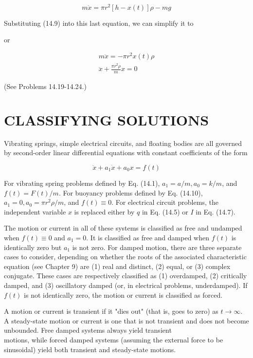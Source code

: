 \documentclass[10pt]{article}
\begin{document}
$$
m \ddot{x}=\pi r^{2}[h-x(t)] \rho-m g
$$

Substituting (14.9) into this last equation, we can simplify it to

or


\begin{gather*}
m \ddot{x}=-\pi r^{2} x(t) \rho \\
\ddot{x}+\frac{\pi r^{2} \rho}{m} x=0 \tag{14.10}
\end{gather*}


(See Problems 14.19-14.24.)

\section*{CLASSIFYING SOLUTIONS}
Vibrating springs, simple electrical circuits, and floating bodies are all governed by second-order linear differential equations with constant coefficients of the form


\begin{equation*}
\ddot{x}+a_{1} \dot{x}+a_{0} x=f(t) \tag{14.11}
\end{equation*}


For vibrating spring problems defined by Eq. (14.1), $a_{1}=a / m, a_{0}=k / m$, and $f(t)=F(t) / m$. For buoyancy problems defined by Eq. (14.10), $a_{1}=0, a_{0}=\pi r^{2} \rho / m$, and $f(t) \equiv 0$. For electrical circuit problems, the independent variable $x$ is replaced either by $q$ in Eq. (14.5) or $I$ in Eq. (14.7).

The motion or current in all of these systems is classified as free and undamped when $f(t) \equiv 0$ and $a_{1}=0$. It is classified as free and damped when $f(t)$ is identically zero but $a_{1}$ is not zero. For damped motion, there are three separate cases to consider, depending on whether the roots of the associated characteristic equation (see Chapter 9) are (1) real and distinct, (2) equal, or (3) complex conjugate. These cases are respectively classified as (1) overdamped, (2) critically damped, and (3) oscillatory damped (or, in electrical problems, underdamped). If $f(t)$ is not identically zero, the motion or current is classified as forced.

A motion or current is transient if it "dies out" (that is, goes to zero) as $t \rightarrow \infty$. A steady-state motion or current is one that is not transient and does not become unbounded. Free damped systems always yield transient\\
motions, while forced damped systems (assuming the external force to be sinusoidal) yield both transient and steady-state motions.
\end{document}
